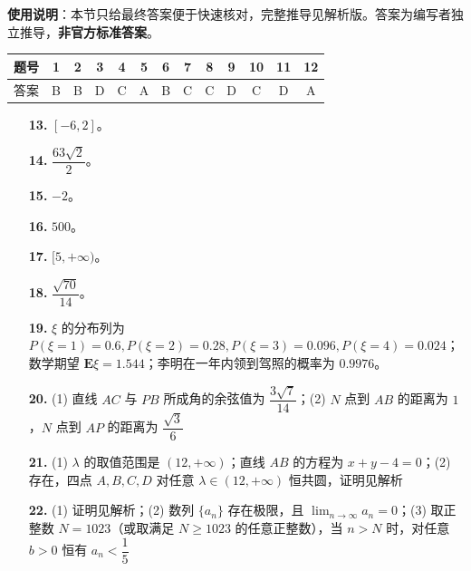 
\begin{gknotice}
\textbf{使用说明}：本节只给最终答案便于快速核对，完整推导见解析版。答案为编写者独立推导，\textbf{非官方标准答案}。
\end{gknotice}

\begin{center}\begin{tabular}{ccccccccccccc}
\toprule
题号 & 1 & 2 & 3 & 4 & 5 & 6 & 7 & 8 & 9 & 10 & 11 & 12 \\
\midrule
答案 & B & B & D & C & A & B & C & C & D & C & D & A \\
\bottomrule
\end{tabular}\end{center}

\begin{itemize}[leftmargin=2.6em]
  \item[\textbf{13.}] $[-6, 2]$。
  \item[\textbf{14.}] $\dfrac{63\sqrt{2}}{2}$。
  \item[\textbf{15.}] $-2$。
  \item[\textbf{16.}] $500$。
\end{itemize}

\begin{itemize}[leftmargin=2.6em]
  \item[\textbf{17.}] $[5, +\infty)$。
  \item[\textbf{18.}] $\dfrac{\sqrt{70}}{14}$。
  \item[\textbf{19.}] $\xi$ 的分布列为 $P(\xi=1)=0.6, P(\xi=2)=0.28, P(\xi=3)=0.096, P(\xi=4)=0.024$；数学期望 $\mathbf{E}\xi = 1.544$；李明在一年内领到驾照的概率为 $0.9976$。
  \item[\textbf{20.}] (1) 直线 $AC$ 与 $PB$ 所成角的余弦值为 $\dfrac{3\sqrt{7}}{14}$；(2) $N$ 点到 $AB$ 的距离为 $1$，$N$ 点到 $AP$ 的距离为 $\dfrac{\sqrt{3}}{6}$
  \item[\textbf{21.}] (1) $\lambda$ 的取值范围是 $(12, +\infty)$；直线 $AB$ 的方程为 $x + y - 4 = 0$；(2) 存在，四点 $A, B, C, D$ 对任意 $\lambda \in (12, +\infty)$ 恒共圆，证明见解析
  \item[\textbf{22.}] (1) 证明见解析；(2) 数列 $\{a_n\}$ 存在极限，且 $\lim_{n\to\infty} a_n = 0$；(3) 取正整数 $N = 1023$（或取满足 $N \geqslant 1023$ 的任意正整数），当 $n > N$ 时，对任意 $b > 0$ 恒有 $a_n < \dfrac{1}{5}$
\end{itemize}
